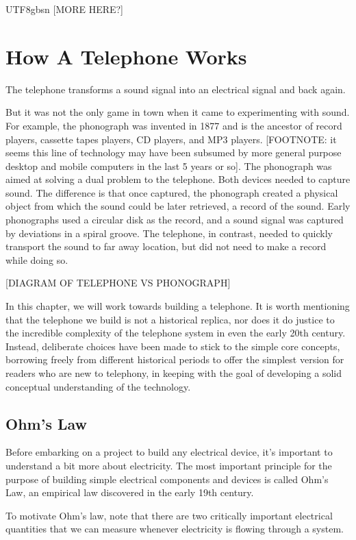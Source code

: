 \documentclass[UTF8]{book}
\begin{document}
\begin{CJK}{UTF8}{gbsn}
[MORE HERE?]

\chapter{How A Telephone Works}

The telephone transforms a sound signal into an electrical signal and back again.

But it was not the only game in town when it came to experimenting with sound. For example, the phonograph was invented in 1877 and is the ancestor of record players, cassette tapes players, CD players, and MP3 players. [FOOTNOTE: it seems this line of technology may have been subsumed by more general purpose desktop and mobile computers in the last 5 years or so]. The phonograph was aimed at solving a dual problem to the telephone. Both devices needed to capture sound. The difference is that once captured, the phonograph created a physical object from which the sound could be later retrieved, a record of the sound. Early phonographs used a circular disk as the record, and a sound signal was captured by deviations in a spiral groove. The telephone, in contrast, needed to quickly transport the sound to far away location, but did not need to make a record while doing so.

[DIAGRAM OF TELEPHONE VS PHONOGRAPH]

In this chapter, we will work towards building a telephone. It is worth mentioning that the telephone we build is not a historical replica, nor does it do justice to the incredible complexity of the telephone system in even the early 20th century. Instead, deliberate choices have been made to stick to the simple core concepts, borrowing freely from different historical periods to offer the simplest version for readers who are new to telephony, in keeping with the goal of developing a solid conceptual understanding of the technology.

\section{Ohm's Law}

Before embarking on a project to build any electrical device, it's important to understand a bit more about electricity. The most important principle for the purpose of building simple electrical components and devices is called Ohm's Law, an empirical law discovered in the early 19th century.

To motivate Ohm's law, note that there are two critically important electrical quantities that we can measure whenever electricity is flowing through a system.


\end{CJK}
\end{document}
